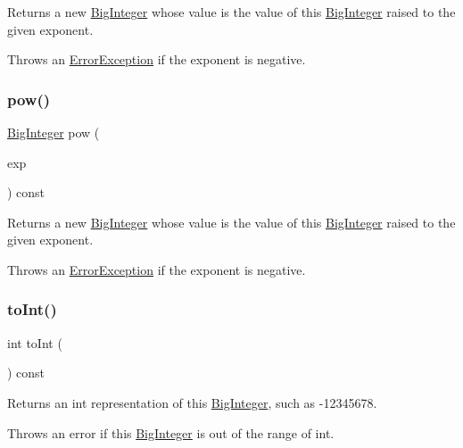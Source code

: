 Returns a new \mbox{\hyperlink{classBigInteger}{Big\+Integer}} whose value is the value of this \mbox{\hyperlink{classBigInteger}{Big\+Integer}} raised to the given exponent. 

Throws an \mbox{\hyperlink{classErrorException}{Error\+Exception}} if the exponent is negative. \mbox{\label{classBigInteger_af004e9189931255ce5d71f55d4ab4976}} 
\subsubsection{\texorpdfstring{pow()}{pow()}\hspace{0.1cm}{\footnotesize\ttfamily [2/2]}}
{\footnotesize\ttfamily \mbox{\hyperlink{classBigInteger}{Big\+Integer}} pow (\begin{DoxyParamCaption}\item[{const \mbox{\hyperlink{classBigInteger}{Big\+Integer}} \&}]{exp }\end{DoxyParamCaption}) const}



Returns a new \mbox{\hyperlink{classBigInteger}{Big\+Integer}} whose value is the value of this \mbox{\hyperlink{classBigInteger}{Big\+Integer}} raised to the given exponent. 

Throws an \mbox{\hyperlink{classErrorException}{Error\+Exception}} if the exponent is negative. \mbox{\label{classBigInteger_a8cc7782de081ce702a9be163b4cb8f84}} 
\subsubsection{\texorpdfstring{to\+Int()}{toInt()}}
{\footnotesize\ttfamily int to\+Int (\begin{DoxyParamCaption}{ }\end{DoxyParamCaption}) const}



Returns an int representation of this \mbox{\hyperlink{classBigInteger}{Big\+Integer}}, such as -\/12345678. 

Throws an error if this \mbox{\hyperlink{classBigInteger}{Big\+Integer}} is out of the range of int. \mbox{\label{classBigInteger_aa762dbabd60643be2be9aa9eb14deddb}} 
